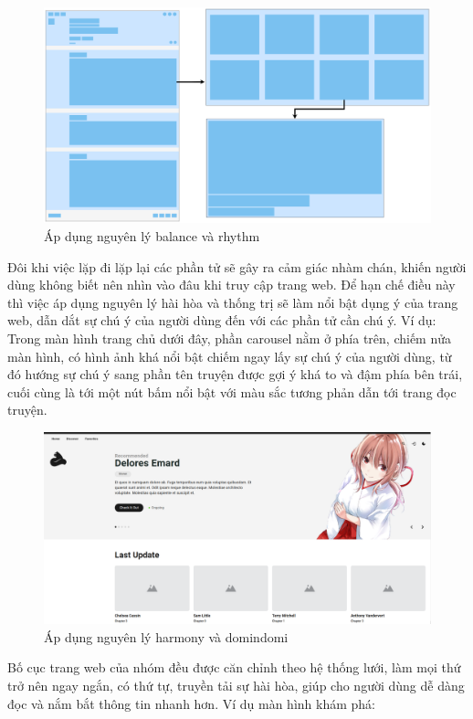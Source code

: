 \documentclass[./../main.tex]{subfiles}
\begin{document}
\begin{figure}[H]
	\centering
	\includegraphics[width=\linewidth]{./images/image3.png}
	\caption{Áp dụng nguyên lý balance và rhythm}
\end{figure}

Đôi khi việc lặp đi lặp lại các phần tử sẽ gây ra cảm giác nhàm chán, khiến người dùng không biết nên nhìn vào đâu khi truy cập trang web. Để hạn chế điều này thì việc áp dụng nguyên lý hài hòa và thống trị sẽ làm nổi bật dụng ý của trang web, dẫn dắt sự chú ý của người dùng đến với các phần tử cần chú ý. Ví dụ: Trong màn hình trang chủ dưới đây, phần carousel nằm ở phía trên, chiếm nửa màn hình, có hình ảnh khá nổi bật chiếm ngay lấy sự chú ý của người dùng, từ đó hướng sự chú ý sang phần tên truyện được gợi ý khá to và đậm phía bên trái, cuối cùng là tới một nút bấm nổi bật với màu sắc tương phản dẫn tới trang đọc truyện.

\begin{figure}[H]
	\centering
	\includegraphics[width=\linewidth]{./images/image10.png}
	\caption{Áp dụng nguyên lý harmony và domindomi}
\end{figure}

Bố cục trang web của nhóm đều được căn chỉnh theo hệ thống lưới, làm mọi thứ trở nên ngay ngắn, có thứ tự, truyền tải sự hài hòa, giúp cho người dùng dễ dàng đọc và nắm bắt thông tin nhanh hơn. Ví dụ màn hình khám phá:
\end{document}

